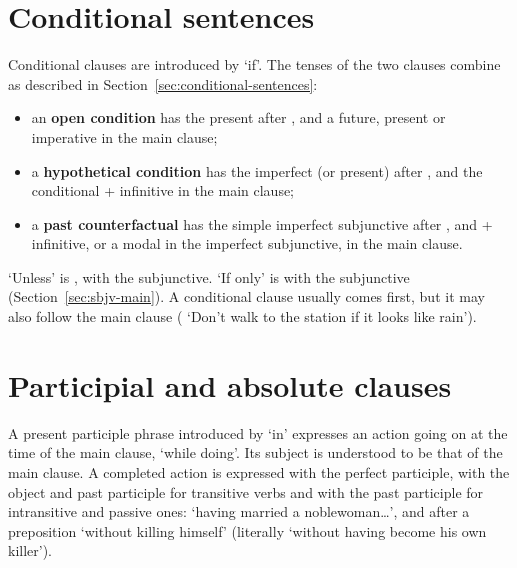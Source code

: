 \section{Conditional sentences}\label{sec:conditionals}
Conditional clauses are introduced by  `if'. The tenses of the two clauses combine as described in Section~\ref{sec:conditional-sentences}:
\begin{itemize}
    \item an \textbf{open condition} has the present after , and a future, present or imperative in the main clause;
    \item a \textbf{hypothetical condition} has the imperfect (or present) after , and the conditional  + infinitive in the main clause;
    \item a \textbf{past counterfactual} has the simple imperfect subjunctive after , and  + infinitive, or a modal in the imperfect subjunctive, in the main clause.
\end{itemize}
`Unless' is , with the subjunctive.
`If only' is  with the subjunctive (Section~\ref{sec:sbjv-main}). A conditional clause usually comes first, but it may also follow the main clause ( `Don't walk to the station if it looks like rain').

\section{Participial and absolute clauses}\label{sec:participial-clauses}
A present participle phrase introduced by  `in' expresses an action going on at the time of the main clause, `while doing'. Its subject is understood to be that of the main clause.
A completed action is expressed with the perfect participle,  with the object and past participle for transitive verbs and  with the past participle for intransitive and passive ones:  `having married a noblewoman\ldots', and after a preposition  `without killing himself' (literally `without having become his own killer').

